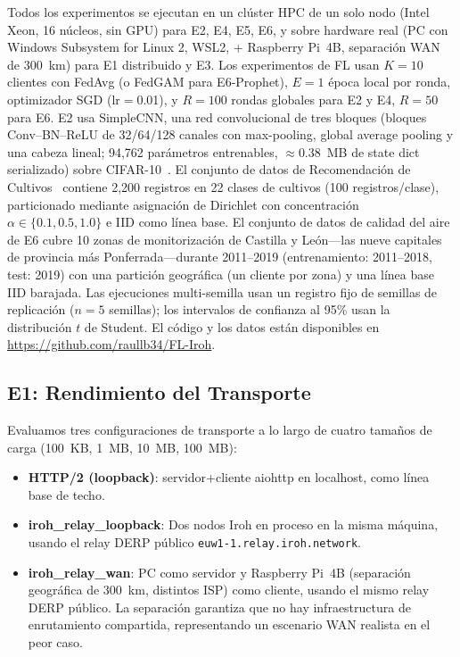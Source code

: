 \documentclass[journal]{IEEEtran}
\begin{document}
Todos los experimentos se ejecutan en un clúster HPC de un solo nodo (Intel Xeon, 16 núcleos, sin GPU) para E2, E4, E5, E6, y sobre hardware real (PC con Windows Subsystem for Linux 2, WSL2, + Raspberry Pi~4B, separación WAN de 300~km) para E1 distribuido y E3. Los experimentos de FL usan $K{=}10$ clientes con FedAvg (o FedGAM para E6-Prophet), $E{=}1$ época local por ronda, optimizador SGD (lr$=$0.01), y $R{=}100$ rondas globales para E2 y E4, $R{=}50$ para E6. E2 usa SimpleCNN, una red convolucional de tres bloques (bloques Conv--BN--ReLU de 32/64/128 canales con max-pooling, global average pooling y una cabeza lineal; 94{,}762 parámetros entrenables, $\approx$0.38~MB de state dict serializado) sobre CIFAR-10~\cite{cifar2009}. El conjunto de datos de Recomendación de Cultivos~\cite{cropdataset} contiene 2,200 registros en 22 clases de cultivos (100 registros/clase), particionado mediante asignación de Dirichlet con concentración $\alpha \in \{0.1, 0.5, 1.0\}$ e IID como línea base. El conjunto de datos de calidad del aire de E6 cubre 10 zonas de monitorización de Castilla y Le\'on---las nueve capitales de provincia más Ponferrada---durante 2011--2019 (entrenamiento: 2011--2018, test: 2019) con una partición geográfica (un cliente por zona) y una línea base IID barajada. Las ejecuciones multi-semilla usan un registro fijo de semillas de replicación ($n{=}5$ semillas); los intervalos de confianza al 95\% usan la distribución $t$ de Student. El código y los datos están disponibles en \url{https://github.com/raullb34/FL-Iroh}.

\subsection{E1: Rendimiento del Transporte}
\label{sec:e1}

Evaluamos tres configuraciones de transporte a lo largo de cuatro tamaños de carga (100~KB, 1~MB, 10~MB, 100~MB):

\begin{itemize}
    \item \textbf{HTTP/2 (loopback)}: servidor+cliente aiohttp en localhost, como línea base de techo.
    \item \textbf{iroh\_relay\_loopback}: Dos nodos Iroh en proceso en la misma máquina, usando el relay DERP público \texttt{euw1-1.relay.iroh.network}.
    \item \textbf{iroh\_relay\_wan}: PC como servidor y Raspberry Pi~4B (separación geográfica de 300~km, distintos ISP) como cliente, usando el mismo relay DERP público. La separación garantiza que no hay infraestructura de enrutamiento compartida, representando un escenario WAN realista en el peor caso.
\end{itemize}
\end{document}
